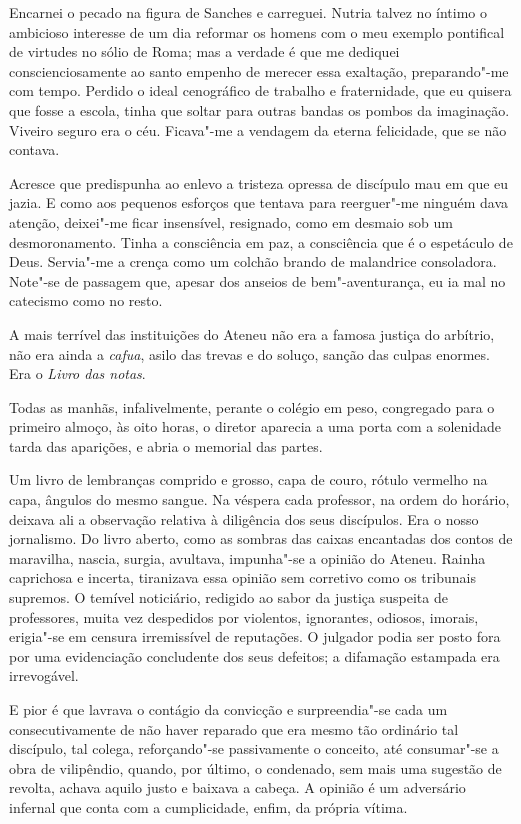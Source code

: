 Encarnei o pecado na figura de Sanches e carreguei. Nutria talvez no
íntimo o ambicioso interesse de um dia reformar os homens com o meu
exemplo pontifical de virtudes no sólio de Roma; mas a verdade é que me
dediquei conscienciosamente ao santo empenho de merecer essa exaltação,
preparando"-me com tempo. Perdido o ideal cenográfico de trabalho e
fraternidade, que eu quisera que fosse a escola, tinha que soltar para
outras bandas os pombos da imaginação. Viveiro seguro era o céu.
Ficava"-me a vendagem da eterna felicidade, que se não contava.

Acresce que predispunha ao enlevo a tristeza opressa de discípulo mau
em que eu jazia. E como aos pequenos esforços que tentava para
reerguer"-me ninguém dava atenção, deixei"-me ficar insensível,
resignado, como em desmaio sob um desmoronamento. Tinha a consciência
em paz, a consciência que é o espetáculo de Deus. Servia"-me a crença
como um colchão brando de malandrice consoladora. Note"-se de passagem
que, apesar dos anseios de bem"-aventurança, eu ia mal no catecismo
como no resto. 

A mais terrível das instituições do Ateneu não era a
famosa justiça do arbítrio, não era ainda a \textit{cafua}, asilo das trevas e
do soluço, sanção das culpas enormes. Era o \textit{Livro das notas}. 

Todas as manhãs, infalivelmente, perante o colégio em peso, congregado para o
primeiro almoço, às oito horas, o diretor aparecia a uma porta com a
solenidade tarda das aparições, e abria o memorial
das partes. 

Um livro de lembranças comprido e grosso, capa de couro,
rótulo vermelho na capa, ângulos do mesmo sangue. Na véspera cada
professor, na ordem do horário, deixava ali a observação relativa à
diligência dos seus discípulos. Era o nosso jornalismo. Do livro
aberto, como as sombras das caixas encantadas dos contos de maravilha,
nascia, surgia, avultava, impunha"-se a opinião do Ateneu. Rainha
caprichosa e incerta, tiranizava essa opinião sem corretivo como os
tribunais supremos. O temível noticiário, redigido ao sabor da justiça
suspeita de professores, muita vez despedidos por violentos,
ignorantes, odiosos, imorais, erigia"-se em censura irremissível de
reputações. O julgador podia ser posto fora por uma evidenciação
concludente dos seus defeitos; a difamação estampada era irrevogável. 

E pior é que lavrava o contágio da convicção e surpreendia"-se cada um
consecutivamente de não haver reparado que era mesmo tão ordinário tal
discípulo, tal colega, reforçando"-se passivamente o conceito, até
consumar"-se a obra de vilipêndio, quando, por último, o condenado,
sem mais uma sugestão de revolta, achava aquilo justo e baixava a
cabeça. A opinião é um adversário infernal que conta com a cumplicidade,
enfim, da própria vítima. 

